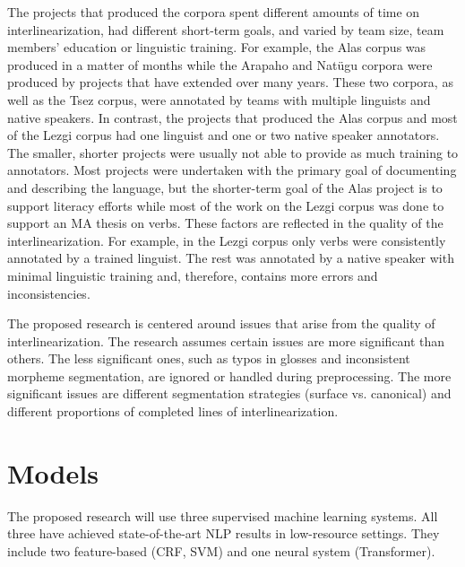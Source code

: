 The projects that produced the corpora spent different amounts of time on interlinearization, had different short-term goals, and varied by team size, team members' education or linguistic training. For example, the Alas corpus was produced in a matter of months while the Arapaho and Natügu corpora were produced by projects that have extended over many years. These two corpora, as well as the Tsez corpus, were annotated by teams with multiple linguists and native speakers. In contrast, the projects that produced the Alas corpus and most of the Lezgi corpus had one linguist and one or two native speaker annotators. The smaller, shorter projects were usually not able to provide as much training to annotators. Most projects were undertaken with the primary goal of documenting and describing the language, but the shorter-term goal of the Alas project is to support literacy efforts while most of the work on the Lezgi corpus was done to support an MA thesis on verbs. These factors are reflected in the quality of the interlinearization. For example, in the Lezgi corpus only verbs were consistently annotated by a trained linguist. The rest was annotated by a native speaker with minimal linguistic training and, therefore, contains more errors and inconsistencies. 

The proposed research is centered around issues that arise from the quality of interlinearization. 
The research assumes certain issues are more significant than others. The less significant ones, such as typos in glosses and inconsistent morpheme segmentation, are ignored or handled during preprocessing. The more significant issues are different segmentation strategies (surface vs. canonical) and different proportions of completed lines of interlinearization.


\section{Models}
\label{sec:models}

The proposed research will use three supervised machine learning systems. All three have achieved state-of-the-art NLP results in low-resource settings. They include two feature-based (CRF, SVM) and one neural system (Transformer). 

